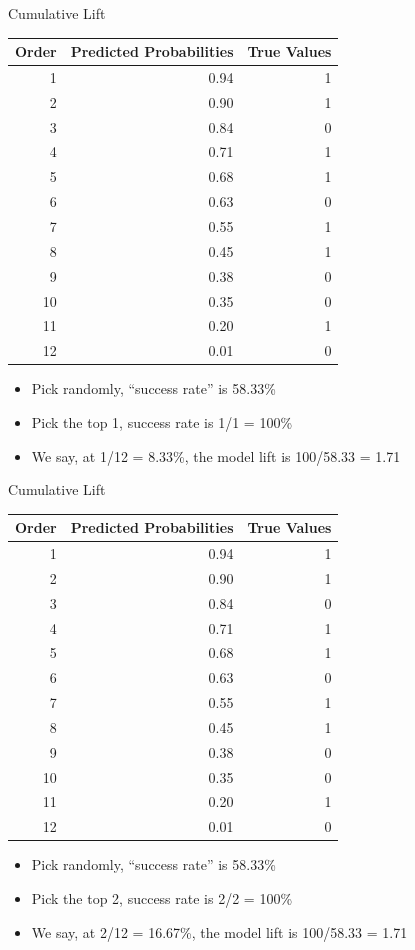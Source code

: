 \documentclass[
  ignorenonframetext,
]{beamer}
\providecommand{\tightlist}{%
  \setlength{\itemsep}{0pt}\setlength{\parskip}{0pt}}
\begin{document}
\begin{frame}{Cumulative Lift}
\protect\hypertarget{cumulative-lift-2}{}

\begin{longtable}[]{@{}rrr@{}}
\toprule
Order & Predicted Probabilities & True Values\tabularnewline
\midrule
\endhead
1 & 0.94 & 1\tabularnewline
2 & 0.90 & 1\tabularnewline
3 & 0.84 & 0\tabularnewline
4 & 0.71 & 1\tabularnewline
5 & 0.68 & 1\tabularnewline
6 & 0.63 & 0\tabularnewline
7 & 0.55 & 1\tabularnewline
8 & 0.45 & 1\tabularnewline
9 & 0.38 & 0\tabularnewline
10 & 0.35 & 0\tabularnewline
11 & 0.20 & 1\tabularnewline
12 & 0.01 & 0\tabularnewline
\bottomrule
\end{longtable}

\begin{itemize}
\tightlist
\item
  Pick randomly, ``success rate'' is 58.33\%
\item
  Pick the top 1, success rate is 1/1 = 100\%
\item
  We say, at 1/12 = 8.33\%, the model lift is 100/58.33 = 1.71
\end{itemize}

\end{frame}

\begin{frame}{Cumulative Lift}
\protect\hypertarget{cumulative-lift-3}{}

\begin{longtable}[]{@{}rrr@{}}
\toprule
Order & Predicted Probabilities & True Values\tabularnewline
\midrule
\endhead
1 & 0.94 & 1\tabularnewline
2 & 0.90 & 1\tabularnewline
3 & 0.84 & 0\tabularnewline
4 & 0.71 & 1\tabularnewline
5 & 0.68 & 1\tabularnewline
6 & 0.63 & 0\tabularnewline
7 & 0.55 & 1\tabularnewline
8 & 0.45 & 1\tabularnewline
9 & 0.38 & 0\tabularnewline
10 & 0.35 & 0\tabularnewline
11 & 0.20 & 1\tabularnewline
12 & 0.01 & 0\tabularnewline
\bottomrule
\end{longtable}

\begin{itemize}
\tightlist
\item
  Pick randomly, ``success rate'' is 58.33\%
\item
  Pick the top 2, success rate is 2/2 = 100\%
\item
  We say, at 2/12 = 16.67\%, the model lift is 100/58.33 = 1.71
\end{itemize}

\end{frame}
\end{document}
